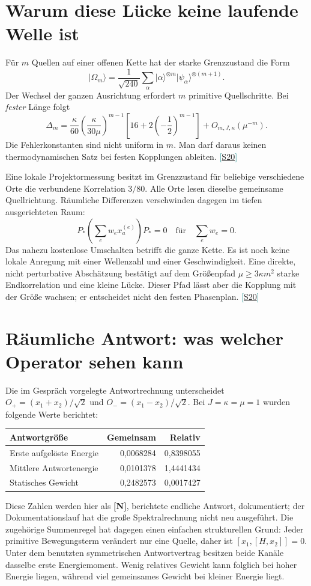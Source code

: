 \documentclass[11pt,a4paper,oneside,parskip=half,headings=normal,numbers=noenddot,bibliography=totoc]{scrreprt}
\newcommand{\ket}[1]{\lvert #1\rangle}
\newcommand{\src}[1]{\textcolor{teal}{\small[\hyperref[s:#1]{S#1}]}}
\newcommand{\st}[1]{\textsf{\textbf{[#1]}}}
\begin{document}
\section{Warum diese Lücke keine laufende Welle ist}
Für $m$ Quellen auf einer offenen Kette hat der starke Grenzzustand die Form
\[
 \ket{\Omega_m}=\frac1{\sqrt{240}}\sum_\alpha
 \ket\alpha^{\otimes m}\ket{\psi_\alpha}^{\otimes(m+1)}.
\]
Der Wechsel der ganzen Ausrichtung erfordert $m$ primitive Quellschritte. Bei \emph{fester} Länge folgt
\[
 \Delta_m=\frac{\kappa}{60}
 \left(\frac{\kappa}{30\mu}\right)^{m-1}
 \left[16+2\left(-\frac12\right)^{m-1}\right]
 +O_{m,J,\kappa}(\mu^{-m}).
\]
Die Fehlerkonstanten sind nicht uniform in $m$. Man darf daraus keinen thermodynamischen Satz bei festen Kopplungen ableiten. \src{20}

Eine lokale Projektormessung besitzt im Grenzzustand für beliebige verschiedene Orte die verbundene Korrelation $3/80$. Alle Orte lesen dieselbe gemeinsame Quellrichtung. Räumliche Differenzen verschwinden dagegen im tiefen ausgerichteten Raum:
\[
 P_*\left(\sum_e w_ex_a^{(e)}\right)P_*=0
 \quad\text{für}\quad\sum_e w_e=0.
\]
Das nahezu kostenlose Umschalten betrifft die ganze Kette. Es ist noch keine lokale Anregung mit einer Wellenzahl und einer Geschwindigkeit. Eine direkte, nicht perturbative Abschätzung bestätigt auf dem Größenpfad $\mu\ge3\kappa m^2$ starke Endkorrelation und eine kleine Lücke. Dieser Pfad lässt aber die Kopplung mit der Größe wachsen; er entscheidet nicht den festen Phasenplan. \src{20}

\section{Räumliche Antwort: was welcher Operator sehen kann}
Die im Gespräch vorgelegte Antwortrechnung unterscheidet $O_+=(x_1+x_2)/\sqrt2$ und $O_-=(x_1-x_2)/\sqrt2$. Bei $J=\kappa=\mu=1$ wurden folgende Werte berichtet:
\begin{center}
\begin{tabular}{@{}lrr@{}}
\toprule
Antwortgröße & Gemeinsam & Relativ\\\midrule
Erste aufgelöste Energie & 0,0068284 & 0,8398055\\
Mittlere Antwortenergie & 0,0101378 & 1,4441434\\
Statisches Gewicht & 0,2482573 & 0,0017427\\\bottomrule
\end{tabular}
\end{center}
Diese Zahlen werden hier als \st{N}, berichtete endliche Antwort, dokumentiert; der Dokumentationslauf hat die große Spektralrechnung nicht neu ausgeführt. Die zugehörige Summenregel hat dagegen einen einfachen strukturellen Grund: Jeder primitive Bewegungsterm verändert nur eine Quelle, daher ist $[x_1,[H,x_2]]=0$. Unter dem benutzten symmetrischen Antwortvertrag besitzen beide Kanäle dasselbe erste Energiemoment. Wenig relatives Gewicht kann folglich bei hoher Energie liegen, während viel gemeinsames Gewicht bei kleiner Energie liegt.
\end{document}
